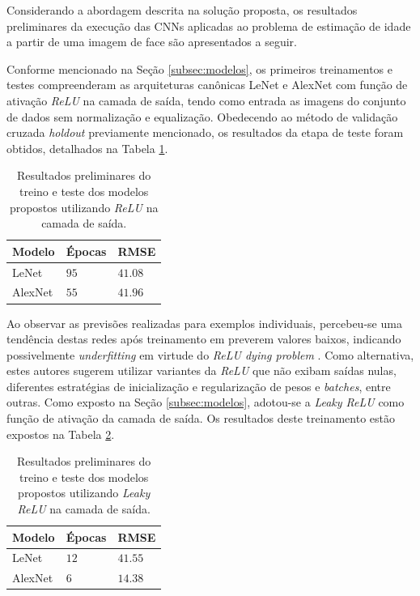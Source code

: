 
Considerando a abordagem descrita na solução proposta, os resultados preliminares da execução das CNNs aplicadas ao problema de estimação de idade a partir de uma imagem de face são apresentados a seguir.

Conforme mencionado na Seção \ref{subsec:modelos}, os primeiros treinamentos e testes compreenderam as arquiteturas canônicas LeNet e AlexNet com função de ativação \emph{ReLU} na camada de saída, tendo como entrada as imagens do conjunto de dados sem normalização e equalização. Obedecendo ao método de validação cruzada \emph{holdout} previamente mencionado, os resultados da etapa de teste foram obtidos, detalhados na Tabela \ref{tab:results_relu}.

\begin{table}[!ht]
     \caption{Resultados preliminares do treino e teste dos modelos propostos utilizando \emph{ReLU} na camada de saída.}
     \label{tab:results_relu}
     \centering
     \begin{tabular}{l l l}
          \toprule
          Modelo & Épocas &RMSE \\
          \midrule
          LeNet & $95$ & $41.08$ \\
          AlexNet & $55$ & $41.96$\\
          \bottomrule
     \end{tabular}
\end{table}

Ao observar as previsões realizadas para exemplos individuais, percebeu-se uma tendência destas redes após treinamento em preverem valores baixos, indicando possivelmente \emph{underfitting} em virtude do \emph{ReLU dying problem} \cite{djork2015elus, dabal2018elus}. Como alternativa, estes autores sugerem  utilizar variantes da \emph{ReLU} que não exibam saídas nulas, diferentes estratégias de inicialização e regularização de pesos e \emph{batches}, entre outras. Como exposto na Seção \ref{subsec:modelos}, adotou-se a \emph{Leaky ReLU} como função de ativação da camada de saída. Os resultados deste treinamento estão expostos na Tabela \ref{tab:results_leaky}.

\begin{table}[!ht]
     \caption{Resultados preliminares do treino e teste dos modelos propostos utilizando \emph{Leaky ReLU} na camada de saída.}
     \label{tab:results_leaky}
     \centering
     \begin{tabular}{l l l}
          \toprule
          Modelo & Épocas & RMSE \\
          \midrule
          LeNet & $12$ & $41.55$ \\
          AlexNet & $6$ & $14.38$\\
          \bottomrule
     \end{tabular}
\end{table}

